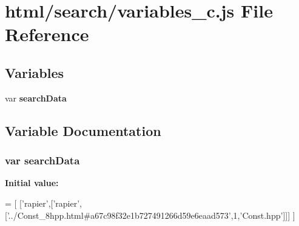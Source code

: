 \section{html/search/variables\-\_\-c.js File Reference}
\label{variables__c_8js}
\subsection*{Variables}
\begin{DoxyCompactItemize}
\item 
var {\bf search\-Data}
\end{DoxyCompactItemize}


\subsection{Variable Documentation}
\subsubsection[{search\-Data}]{\setlength{\rightskip}{0pt plus 5cm}var search\-Data}\label{variables__c_8js_ad01a7523f103d6242ef9b0451861231e}
{\bfseries Initial value\-:}
\begin{DoxyCode}
=
[
  [\textcolor{stringliteral}{'rapier'},[\textcolor{stringliteral}{'rapier'},[\textcolor{stringliteral}{'../Const\_8hpp.html#a67c98f32e1b727491266d59e6eaad573'},1,\textcolor{stringliteral}{'Const.hpp'}]]]
]
\end{DoxyCode}
